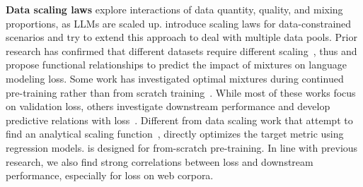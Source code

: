 \textbf{Data scaling laws} explore interactions of data quantity, quality, and mixing proportions, as LLMs are scaled up. \citet{muennighoff2023scaling} introduce scaling laws for data-constrained scenarios and \citet{goyal2024scaling} try to extend this approach to deal with multiple data pools. Prior research has confirmed that different datasets require different scaling~\citep{hoffmann2022training,pandey2024gzip}, thus \citet{ye2024datamixing} and \citet{ge2024data} propose functional relationships to predict the impact of mixtures on language modeling loss. Some work has investigated optimal mixtures during continued pre-training rather than from scratch training~\citep{que2024dcpt,dou2024sailor}. While most of these works focus on validation loss, others investigate downstream performance and develop predictive relations with loss~\citep{gadre2024language,yang2024fine,xia2022training}.
Different from data scaling work that attempt to find an analytical scaling function~\citep{hoffmann2022training}, \ourmethod directly optimizes the target metric using regression models.
\ourmethod is designed for from-scratch pre-training. In line with previous research, we also find strong correlations between loss and downstream performance, especially for loss on web corpora.




